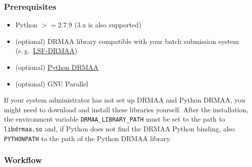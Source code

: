 \documentclass[bibliography=totoc,12pt,a4paper]{scrartcl}
\newcommand{\kwd}[1]{\texttt{#1}}
\begin{document}
\subsubsection{Prerequisites}

\begin{itemize}
 \item Python $>= 2.7.9$ (3.x is also supported)
 \item (optional) DRMAA library compatible with your batch submission system\\
 (e.\,g.\ \href{https://github.com/IBMSpectrumComputing/lsf-drmaa}{LSF-DRMAA})
 \item (optional) \href{https://github.com/drmaa-python/drmaa-python.github.com}{Python DRMAA}
 \item (optional) GNU Parallel
\end{itemize}

If your system administrator has not set up DRMAA and Python DRMAA, you might need to download and install these libraries yourself. After the installation, the environment variable \kwd{DRMAA\_LIBRARY\_PATH} must be set to the path to \kwd{libdrmaa.so} and, if Python does not find the DRMAA Python binding, also \kwd{PYTHONPATH} to the path of the Python DRMAA library.

\subsubsection{Workflow}\label{sec:4rdm-workflow}
\end{document}
